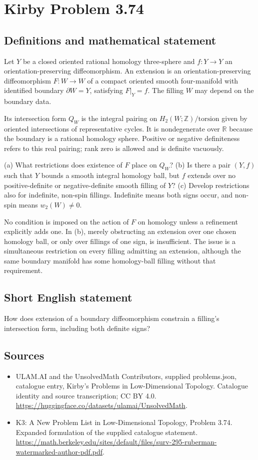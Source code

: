 \documentclass[11pt,a4paper]{article}
\begin{document}
\section*{Kirby Problem 3.74}\label{statement}

\subsection{Definitions and mathematical statement}
Let $Y$ be a closed oriented rational homology three-sphere and $f:Y\to Y$ an orientation-preserving diffeomorphism. An extension is an orientation-preserving diffeomorphism $F:W\to W$ of a compact oriented smooth four-manifold with identified boundary $\partial W=Y$, satisfying $F|_Y=f$. The filling $W$ may depend on the boundary data.

Its intersection form $Q_W$ is the integral pairing on $H_2(W;\mathbb Z)/\mathrm{torsion}$ given by oriented intersections of representative cycles. It is nondegenerate over $\mathbb R$ because the boundary is a rational homology sphere. Positive or negative definiteness refers to this real pairing; rank zero is allowed and is definite vacuously.

(a) What restrictions does existence of $F$ place on $Q_W$? (b) Is there a pair $(Y,f)$ such that $Y$ bounds a smooth integral homology ball, but $f$ extends over no positive-definite or negative-definite smooth filling of $Y$? (c) Develop restrictions also for indefinite, non-spin fillings. Indefinite means both signs occur, and non-spin means $w_2(W)\ne0$.

No condition is imposed on the action of $F$ on homology unless a refinement explicitly adds one. In (b), merely obstructing an extension over one chosen homology ball, or only over fillings of one sign, is insufficient. The issue is a simultaneous restriction on every filling admitting an extension, although the same boundary manifold has some homology-ball filling without that requirement.
\subsection{Short English statement}
How does extension of a boundary diffeomorphism constrain a filling's intersection form, including both definite signs?
\subsection{Sources}
\begin{itemize}
\item[S1] ULAM.AI and the UnsolvedMath Contributors, supplied problems.json, catalogue entry, Kirby's Problems in Low-Dimensional Topology. Catalogue identity and source transcription; CC BY 4.0.
\url{https://huggingface.co/datasets/ulamai/UnsolvedMath}.
\item[S2] K3: A New Problem List in Low-Dimensional Topology, Problem 3.74. Expanded formulation of the supplied catalogue statement.
\url{https://math.berkeley.edu/sites/default/files/surv-295-ruberman-watermarked-author-pdf.pdf}.
\end{itemize}
\end{document}
